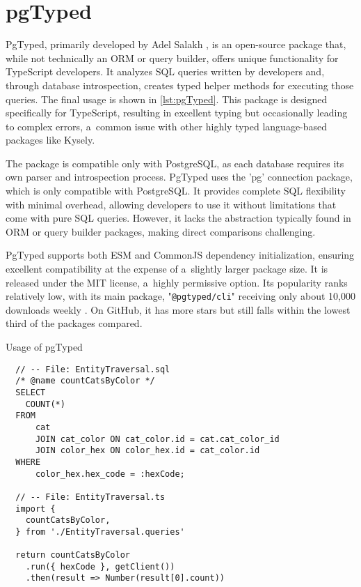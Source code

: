 \section{pgTyped}
PgTyped, primarily developed by Adel Salakh \cite{pgTyped}, is an open-source
package that, while not technically an ORM or query builder, offers unique
functionality for TypeScript developers. It analyzes SQL queries written by
developers and, through database introspection, creates typed helper methods for
executing those queries. The final usage is shown in \autoref{lst:pgTyped}. This
package is designed specifically for TypeScript, resulting in excellent typing
but occasionally leading to complex errors, a~common issue with other highly
typed language-based packages like Kysely.

The package is compatible only with PostgreSQL, as each database requires its
own parser and introspection process. PgTyped uses the 'pg' connection package,
which is only compatible with PostgreSQL. It provides complete SQL flexibility
with minimal overhead, allowing developers to use it without limitations that
come with pure SQL queries. However, it lacks the abstraction typically found in
ORM or query builder packages, making direct comparisons challenging.

PgTyped supports both ESM and CommonJS dependency initialization, ensuring
excellent compatibility at the expense of a~slightly larger package size. It is
released under the MIT license, a~highly permissive option. Its popularity ranks
relatively low, with its main package, "\texttt{@pgtyped/cli}" receiving only
about 10,000 downloads weekly \cite{pgtyped/cli}. On GitHub, it has more stars
but still falls within the lowest third of the packages compared.

\begin{listing}[ht]
  \caption{Usage of pgTyped}
  \label{lst:pgTyped}
  \begin{verbatim}
  // -- File: EntityTraversal.sql
  /* @name countCatsByColor */
  SELECT
    COUNT(*)
  FROM
      cat
      JOIN cat_color ON cat_color.id = cat.cat_color_id
      JOIN color_hex ON color_hex.id = cat_color.id
  WHERE
      color_hex.hex_code = :hexCode;
  
  // -- File: EntityTraversal.ts 
  import {
    countCatsByColor,
  } from './EntityTraversal.queries'
  
  return countCatsByColor
    .run({ hexCode }, getClient())
    .then(result => Number(result[0].count))
  
  \end{verbatim}
\end{listing}

